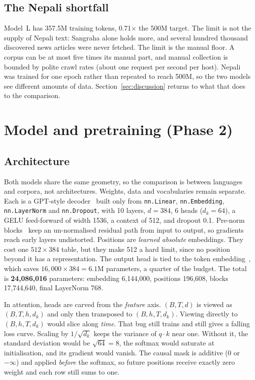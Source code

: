 \documentclass[10pt,a4paper]{article}
\newcommand{\ML}{Model~L}
\newcommand{\code}[1]{\texttt{#1}}
\begin{document}
\subsection{The Nepali shortfall}
\ML{} has 357.5M training tokens, 0.71$\times$ the 500M target. The limit is not the supply of Nepali text: Sangraha alone holds more, and several hundred thousand discovered news articles were never fetched.
The limit is the manual floor. A corpus can be at most five times its manual part, and manual collection is bounded by polite crawl rates (about one request per second per host).
Nepali was trained for one epoch rather than repeated to reach 500M, so the two models see different amounts of data. Section~\ref{sec:discussion} returns to what that does to the comparison.

\section{Model and pretraining (Phase 2)}
\subsection{Architecture}
Both models share the same geometry, so the comparison is between languages and corpora, not architectures. Weights, data and vocabularies remain separate.
Each is a GPT-style decoder~\cite{vaswani,gpt2} built only from \code{nn.Linear}, \code{nn.Embedding}, \code{nn.LayerNorm} and \code{nn.Dropout}, with 10 layers, $d=384$, 6 heads ($d_k=64$), a GELU feed-forward of width 1536, a context of 512, and dropout 0.1.
Pre-norm blocks~\cite{prenorm} keep an un-normalised residual path from input to output, so gradients reach early layers undistorted.
Positions are \emph{learned absolute} embeddings. They cost one $512\times384$ table, but they make 512 a hard limit, since no position beyond it has a representation.
The output head is tied to the token embedding~\cite{tying}, which saves $16{,}000\times384=6.1$M parameters, a quarter of the budget.
The total is \textbf{24,086,016} parameters: embedding 6,144,000, positions 196,608, blocks 17,744,640, final LayerNorm 768.

In attention, heads are carved from the \emph{feature} axis. $(B,T,d)$ is viewed as $(B,T,h,d_k)$ and only then transposed to $(B,h,T,d_k)$.
Viewing directly to $(B,h,T,d_k)$ would slice along \emph{time}. That bug still trains and still gives a falling loss curve.
Scaling by $1/\sqrt{d_k}$ keeps the variance of $q\cdot k$ near one. Without it, the standard deviation would be $\sqrt{64}=8$, the softmax would saturate at initialisation, and its gradient would vanish.
The causal mask is additive ($0$ or $-\infty$) and applied \emph{before} the softmax, so future positions receive exactly zero weight and each row still sums to one.
\end{document}
